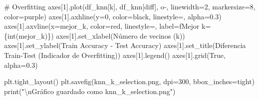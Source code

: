 \documentclass[
  doc,
  floatsintext,
  longtable,
  a4paper,
  nolmodern,
  notxfonts,
  notimes,
  12pt,
  colorlinks=true,linkcolor=blue,citecolor=blue,urlcolor=blue]{apa7}
\newenvironment{Shaded}{\begin{snugshade}}{\end{snugshade}}
\newcommand{\BuiltInTok}[1]{\textcolor[rgb]{0.00,0.23,0.31}{#1}}
\newcommand{\CharTok}[1]{\textcolor[rgb]{0.13,0.47,0.30}{#1}}
\newcommand{\CommentTok}[1]{\textcolor[rgb]{0.37,0.37,0.37}{#1}}
\newcommand{\DecValTok}[1]{\textcolor[rgb]{0.68,0.00,0.00}{#1}}
\newcommand{\FloatTok}[1]{\textcolor[rgb]{0.68,0.00,0.00}{#1}}
\newcommand{\NormalTok}[1]{\textcolor[rgb]{0.00,0.23,0.31}{#1}}
\newcommand{\OperatorTok}[1]{\textcolor[rgb]{0.37,0.37,0.37}{#1}}
\newcommand{\SpecialCharTok}[1]{\textcolor[rgb]{0.37,0.37,0.37}{#1}}
\newcommand{\SpecialStringTok}[1]{\textcolor[rgb]{0.13,0.47,0.30}{#1}}
\newcommand{\StringTok}[1]{\textcolor[rgb]{0.13,0.47,0.30}{#1}}
\newcommand{\VariableTok}[1]{\textcolor[rgb]{0.07,0.07,0.07}{#1}}
\begin{document}
\begin{Shaded}
\begin{Highlighting}[]
\CommentTok{\# Overfitting}
\NormalTok{axes[}\DecValTok{1}\NormalTok{].plot(df\_knn[}\StringTok{\textquotesingle{}k\textquotesingle{}}\NormalTok{], df\_knn[}\StringTok{\textquotesingle{}diff\textquotesingle{}}\NormalTok{], }\StringTok{\textquotesingle{}o{-}\textquotesingle{}}\NormalTok{, }
\NormalTok{             linewidth}\OperatorTok{=}\DecValTok{2}\NormalTok{, markersize}\OperatorTok{=}\DecValTok{8}\NormalTok{, color}\OperatorTok{=}\StringTok{\textquotesingle{}purple\textquotesingle{}}\NormalTok{)}
\NormalTok{axes[}\DecValTok{1}\NormalTok{].axhline(y}\OperatorTok{=}\DecValTok{0}\NormalTok{, color}\OperatorTok{=}\StringTok{\textquotesingle{}black\textquotesingle{}}\NormalTok{, linestyle}\OperatorTok{=}\StringTok{\textquotesingle{}{-}{-}\textquotesingle{}}\NormalTok{, alpha}\OperatorTok{=}\FloatTok{0.3}\NormalTok{)}
\NormalTok{axes[}\DecValTok{1}\NormalTok{].axvline(x}\OperatorTok{=}\NormalTok{mejor\_k, color}\OperatorTok{=}\StringTok{\textquotesingle{}red\textquotesingle{}}\NormalTok{, linestyle}\OperatorTok{=}\StringTok{\textquotesingle{}{-}{-}\textquotesingle{}}\NormalTok{, }
\NormalTok{                label}\OperatorTok{=}\SpecialStringTok{f\textquotesingle{}Mejor k=}\SpecialCharTok{\{}\BuiltInTok{int}\NormalTok{(mejor\_k)}\SpecialCharTok{\}}\SpecialStringTok{\textquotesingle{}}\NormalTok{)}
\NormalTok{axes[}\DecValTok{1}\NormalTok{].set\_xlabel(}\StringTok{\textquotesingle{}Número de vecinos (k)\textquotesingle{}}\NormalTok{)}
\NormalTok{axes[}\DecValTok{1}\NormalTok{].set\_ylabel(}\StringTok{\textquotesingle{}Train Accuracy {-} Test Accuracy\textquotesingle{}}\NormalTok{)}
\NormalTok{axes[}\DecValTok{1}\NormalTok{].set\_title(}\StringTok{\textquotesingle{}Diferencia Train{-}Test (Indicador de Overfitting)\textquotesingle{}}\NormalTok{)}
\NormalTok{axes[}\DecValTok{1}\NormalTok{].legend()}
\NormalTok{axes[}\DecValTok{1}\NormalTok{].grid(}\VariableTok{True}\NormalTok{, alpha}\OperatorTok{=}\FloatTok{0.3}\NormalTok{)}

\NormalTok{plt.tight\_layout()}
\NormalTok{plt.savefig(}\StringTok{\textquotesingle{}knn\_k\_selection.png\textquotesingle{}}\NormalTok{, dpi}\OperatorTok{=}\DecValTok{300}\NormalTok{, bbox\_inches}\OperatorTok{=}\StringTok{\textquotesingle{}tight\textquotesingle{}}\NormalTok{)}
\BuiltInTok{print}\NormalTok{(}\StringTok{"}\CharTok{\textbackslash{}n}\StringTok{Gráfico guardado como \textquotesingle{}knn\_k\_selection.png\textquotesingle{}"}\NormalTok{)}
\end{Highlighting}
\end{Shaded}
\end{document}
